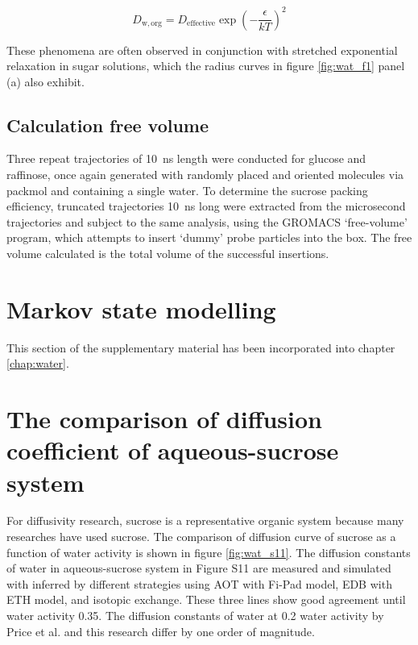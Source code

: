 \begin{equation}
D_{\mathrm{w, org}}=D_{\mathrm{effective}} \exp \left(-\frac{\epsilon}{k T}\right)^{2}
\end{equation}

These  phenomena  are  often  observed  in  conjunction  with stretched  exponential  relaxation  in  sugar solutions\cite{mesteGlassTransitionFood2002,Liu2006}, which the radius curves in figure \ref{fig:wat_f1} panel (a) also exhibit. 

\subsection{Calculation free volume}
Three repeat trajectories of \SI{10}{\nano\second} length were conducted for glucose and raffinose, once again generated with randomly placed and oriented molecules via packmol and containing a single water. To determine the sucrose packing efficiency, truncated trajectories \SI{10}{\nano\second} long were extracted from the microsecond trajectories and subject to the same analysis, using the GROMACS `free-volume’ program, which attempts to insert `dummy’ probe particles into the box. The free volume calculated is the total volume of the successful insertions.

\section{Markov state modelling}

This section of the supplementary material has been incorporated into chapter \ref{chap:water}. 

\section{The comparison of diffusion coefficient of aqueous-sucrose system}

For diffusivity research, sucrose is a representative organic system because many researches have used sucrose. The comparison of diffusion curve of sucrose as a function of water activity is shown in figure \ref{fig:wat_s11}. The diffusion constants of water in aqueous-sucrose system in Figure S11 are measured and simulated with inferred by different strategies using AOT with Fi-Pad model, EDB with ETH model, and isotopic exchange. These three lines show good agreement until water activity \num{0.35}. The diffusion constants of water at \num{0.2} water activity by Price et al.\cite{Price2014} and this research differ by one order of magnitude. 

